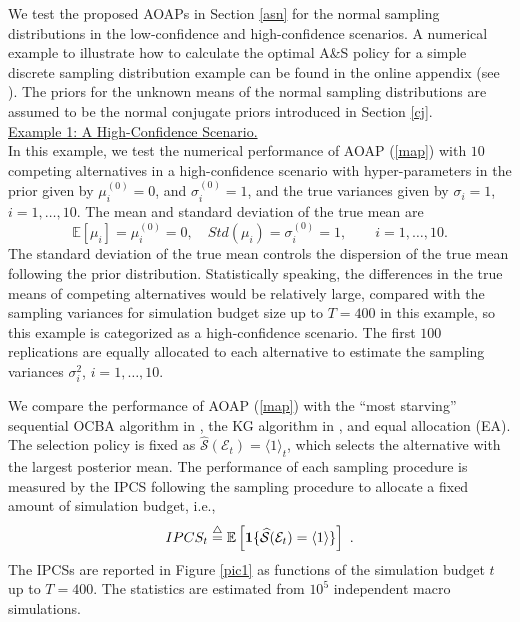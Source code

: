 \documentclass[journal]{IEEEtran}
\newcommand{\ed}{\stackrel{\triangle}{=}}
\begin{document}
  
   
   We test the proposed AOAPs in Section \ref{asn} for the normal sampling distributions in the low-confidence and high-confidence scenarios. 
   A numerical example to illustrate how to calculate the optimal A\&S policy for a simple discrete sampling distribution example can be found in the online appendix (see \cite{peng2017stochastic}).
   The priors for the unknown means of the normal sampling distributions are assumed to be the normal conjugate priors introduced in Section \ref{cj}. \\
   
   \noindent\underline{Example 1: A High-Confidence Scenario.}\\
    
   In this example, we test the numerical performance of AOAP (\ref{map}) with $10$ competing alternatives in a high-confidence scenario with hyper-parameters in the prior given by $\mu_i^{(0)}=0$, and $\sigma^{(0)}_i=1$, and the true variances given by $\sigma_i=1$, $i=1,\ldots,10$. The mean and standard deviation of the true mean are
   $$\mathbb{E}\left[ \mu_i \right]=\mu_i^{(0)}=0,\quad Std\left( \mu_i \right)=\sigma^{(0)}_i=1,\qquad i=1,\ldots,10.$$
   The standard deviation of the true mean controls the dispersion of the true mean following the prior distribution. Statistically speaking, the differences in the true means of competing alternatives would be relatively large, compared with the sampling variances for simulation budget size  up to $T=400$ in this example, so this example is categorized as a high-confidence scenario. 
    The first $100$ replications are equally allocated to each alternative to estimate the sampling variances $\sigma_i^2$, $i=1,\ldots,10$. 
    
    We compare the performance of  AOAP (\ref{map}) with the ``most starving'' sequential OCBA algorithm in \cite{chen2011stochastic},  the KG algorithm in \cite{frazier2008knowledge}, and equal allocation (EA). The selection policy is fixed as $\widehat{\mathcal{S}}(\mathcal{E}_t)=\langle 1 \rangle_t$, which selects the alternative with the largest posterior mean. 
    The performance of each sampling procedure is measured by the IPCS  following the sampling procedure to allocate a fixed amount of simulation budget, i.e., 
    $$IPCS_t\ed\mathbb{E}\left[{\bf1}\{ \widehat{\mathcal{S}}(\mathcal{E}_t)=\langle 1 \rangle \}\right]~.$$
    The IPCSs are reported in Figure \ref{pic1} as functions of the simulation budget $t$ up to $T=400$. The statistics are estimated from $10^5$ independent macro simulations. 
    
\end{document}
